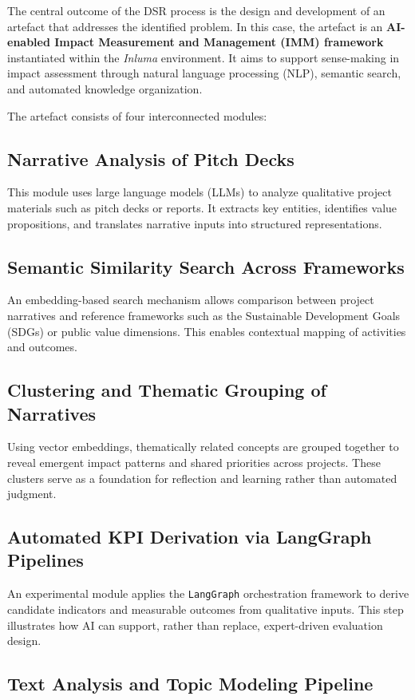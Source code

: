 The central outcome of the DSR process is the design and development of an artefact that addresses the identified problem.
In this case, the artefact is an \textbf{AI-enabled Impact Measurement and Management (IMM) framework} instantiated within the \textit{Inluma} environment.
It aims to support sense-making in impact assessment through natural language processing (NLP), semantic search, and automated knowledge organization.

The artefact consists of four interconnected modules:

\subsection{Narrative Analysis of Pitch Decks}
This module uses large language models (LLMs) to analyze qualitative project materials such as pitch decks or reports.
It extracts key entities, identifies value propositions, and translates narrative inputs into structured representations.

\subsection{Semantic Similarity Search Across Frameworks}
An embedding-based search mechanism allows comparison between project narratives and reference frameworks such as the Sustainable Development Goals (SDGs) or public value dimensions.
This enables contextual mapping of activities and outcomes.

\subsection{Clustering and Thematic Grouping of Narratives}
Using vector embeddings, thematically related concepts are grouped together to reveal emergent impact patterns and shared priorities across projects.
These clusters serve as a foundation for reflection and learning rather than automated judgment.

\subsection{Automated KPI Derivation via LangGraph Pipelines}
An experimental module applies the \texttt{LangGraph} orchestration framework to derive candidate indicators and measurable outcomes from qualitative inputs.
This step illustrates how AI can support, rather than replace, expert-driven evaluation design.

\subsection{Text Analysis and Topic Modeling Pipeline}\label{subsec:text-analysis-pipeline}

